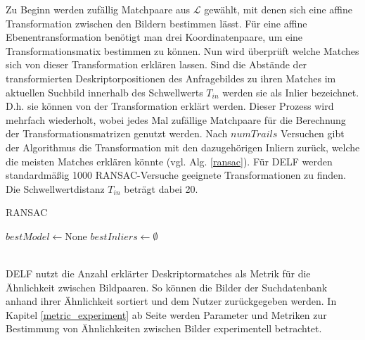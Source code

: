 Zu Beginn werden zufällig Matchpaare aus $\mathcal{L}$ gewählt, mit denen sich eine affine Transformation zwischen den Bildern bestimmen lässt. Für eine affine Ebenentransformation benötigt man drei Koordinatenpaare, um eine Transformationsmatix bestimmen zu können. Nun wird überprüft welche Matches sich von dieser Transformation erklären lassen. Sind die Abstände der transformierten Deskriptorpositionen des Anfragebildes zu ihren Matches im aktuellen Suchbild innerhalb des Schwellwerts $T_{in}$ werden sie als Inlier bezeichnet. D.h. sie können von der Transformation erklärt werden. Dieser Prozess wird mehrfach wiederholt, wobei jedes Mal zufällige Matchpaare für die Berechnung der Transformationsmatrizen genutzt werden.   Nach $numTrails$ Versuchen gibt der Algorithmus die Transformation mit den dazugehörigen Inliern zurück, welche die meisten Matches erklären könnte (vgl. Alg. \ref{ransac}). Für DELF werden standardmäßig 1000 RANSAC-Versuche geeignete Transformationen zu finden. Die Schwellwertdistanz $T_{in}$ beträgt dabei 20. 
\begin{algorithm}[h]
\caption{RANSAC}
\label{ransac}
\DontPrintSemicolon
{}
$bestModel \leftarrow \text{None}$ \;
$bestInliers \leftarrow \emptyset$ \;
 \;
\end{algorithm}
\\
DELF nutzt die Anzahl erklärter Deskriptormatches als Metrik für die Ähnlichkeit zwischen Bildpaaren. So können die Bilder der Suchdatenbank anhand ihrer Ähnlichkeit sortiert und dem Nutzer zurückgegeben werden. In Kapitel \ref{metric_experiment} ab Seite \pageref{metric_experiment} werden Parameter und Metriken zur Bestimmung von Ähnlichkeiten zwischen Bilder experimentell betrachtet. 


